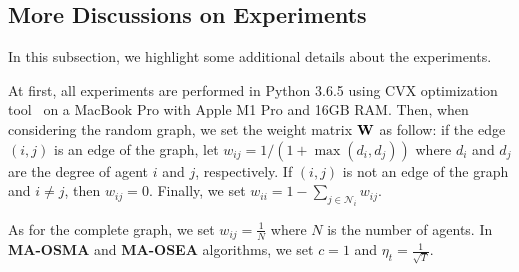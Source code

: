 \subsection{More Discussions on Experiments}
In this subsection, we highlight some additional details about the experiments. 

At first, all experiments are performed in Python 3.6.5 using CVX optimization tool~\citep{grant2014cvx} on a MacBook Pro with Apple M1 Pro and 16GB RAM. Then, when considering the random graph, we set the weight matrix $\mathbf{W}$ as follow: if the edge $(i,j)$ is an edge of the graph, let $w_{ij}=1/(1+\max(d_{i},d_{j}))$ where $d_{i}$ and $d_{j}$ are the degree of agent $i$ and $j$, respectively. If $(i,j)$ is not an edge of the graph and $i\neq j$, then $w_{ij}=0$. Finally, we set $w_{ii}=1-\sum_{j\in\mathcal{N}_{i}}w_{ij}$. 

As for the complete graph, we set $w_{ij}=\frac{1}{N}$ where $N$ is the number of agents. In \textbf{MA-OSMA} and \textbf{MA-OSEA} algorithms, we set $c=1$ and $\eta_{t}=\frac{1}{\sqrt{T}}$.

